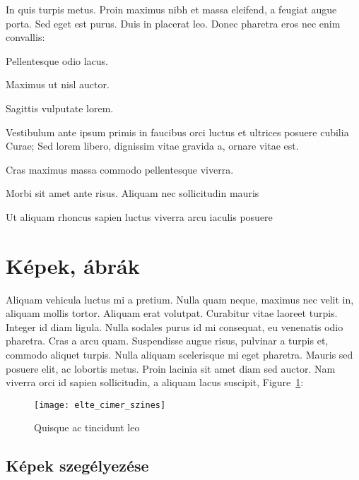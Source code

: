 \bigskip

In quis turpis metus. Proin maximus nibh et massa eleifend, a feugiat augue porta. Sed eget est purus. Duis in placerat leo. Donec pharetra eros nec enim convallis:
\begin{compactitem}
	\item Pellentesque odio lacus.
	\item Maximus ut nisl auctor.
	\item Sagittis vulputate lorem.
	\item {}
\end{compactitem}

\bigskip

Vestibulum ante ipsum primis in faucibus orci luctus et ultrices posuere cubilia Curae; Sed lorem libero, dignissim vitae gravida a, ornare vitae est.
\begin{compactdesc}
	\item[Cras maximus] massa commodo pellentesque viverra.
	\item[Morbi sit] amet ante risus. Aliquam nec sollicitudin mauris
	\item[Ut aliquam rhoncus sapien] luctus viverra arcu iaculis posuere
\end{compactdesc}


\section{Képek, ábrák} %

Aliquam vehicula luctus mi a pretium. Nulla quam neque, maximus nec velit in, aliquam mollis tortor. Aliquam erat volutpat. Curabitur vitae laoreet turpis. Integer id diam ligula. Nulla sodales purus id mi consequat, eu venenatis odio pharetra. Cras a arcu quam. Suspendisse augue risus, pulvinar a turpis et, commodo aliquet turpis. Nulla aliquam scelerisque mi eget pharetra. Mauris sed posuere elit, ac lobortis metus. Proin lacinia sit amet diam sed auctor. Nam viverra orci id sapien sollicitudin, a aliquam lacus suscipit, Figure~\ref{fig:example-1}:

\begin{figure}[H]
	\centering
	\texttt{[image: elte\_cimer\_szines]}
	\caption{Quisque ac tincidunt leo}
	\label{fig:example-1}
\end{figure}

\subsection{Képek szegélyezése} %

